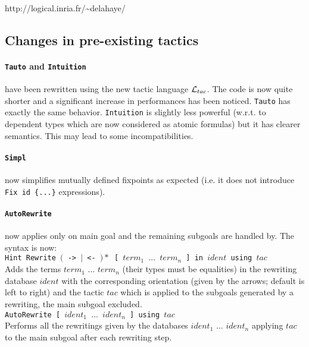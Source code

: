 \documentclass[11pt]{article}
\begin{document}
http://logical.inria.fr/\~{}delahaye/

\subsection{Changes in pre-existing tactics}
\label{TacticChanges}

   \paragraph{{\tt Tauto} and {\tt Intuition}} have been rewritten using the
   new tactic language ${\cal L}_{tac}$. The code is now quite shorter and a significant
   increase in performances has been noticed. {\tt Tauto} has exactly the same
   behavior. {\tt Intuition} is slightly less powerful (w.r.t. to dependent
   types which are now considered as atomic formulas) but it has clearer
   semantics. This may lead to some incompatibilities.

  \paragraph{{\tt Simpl}} now simplifies mutually defined fixpoints
  as expected (i.e. it does not introduce {\tt Fix id
  \{...\}} expressions).

  \paragraph{{\tt AutoRewrite}} now applies only on main goal and the remaining
  subgoals are handled by. The syntax is now:\\

  {\tt Hint Rewrite $($ -> $|$ <- $)*$ [ $term_1$ $...$ $term_n$ ] in
    $ident$ using $tac$}\\

  Adds the terms $term_1$ $...$ $term_n$ (their types must be equalities) in
  the rewriting database $ident$ with the corresponding orientation (given by
  the arrows; default is left to right) and the tactic $tac$ which is applied
  to the subgoals generated by a rewriting, the main subgoal excluded.\\

  {\tt AutoRewrite  [ $ident_1$ $...$ $ident_n$ ] using $tac$}\\

  Performs all the rewritings given by the databases $ident_1$ $...$ $ident_n$
  applying $tac$ to the main subgoal after each rewriting step.\\
\end{document}
